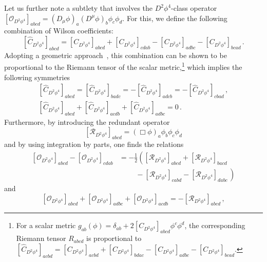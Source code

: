Let us further note a subtlety that involves the $D^2\phi^4$-class operator $[\mathcal O_{D^2\phi^4}]_{abcd} = (D_\mu \phi)_a (D^\mu \phi)_b \phi_c \phi_d$. 
For this, we define the following combination of Wilson coefficients:
\begin{equation}\label{eq:hatCD2phi4}
\left[\widehat C_{D^2\phi^4}\right]_{abcd}=\left[C_{D^2\phi^4}\right]_{abcd}+\left[C_{D^2\phi^4}\right]_{cdab}-\left[C_{D^2\phi^4}\right]_{adbc}-\left[C_{D^2\phi^4}\right]_{bcad}\,.
\end{equation}
Adopting a geometric approach~\cite{Helset:2022pde,Assi:2023zid,Jenkins:2023rtg,Jenkins:2023bls}, this combination can be shown to be proportional to the Riemann tensor of the scalar metric,\footnote{For a scalar metric $g_{ab}(\phi) = \delta_{ab} + 2[C_{D^2\phi^4}]_{abcd}\phi^c \phi^d$, the corresponding Riemann tensor $R_{abcd}$ is proportional to $[\widehat C_{D^2\phi^4}]_{acbd} = [C_{D^2\phi^4}]_{acbd}+[C_{D^2\phi^4}]_{bdac}-[C_{D^2\phi^4}]_{adbc}-[C_{D^2\phi^4}]_{bcad}$.} which implies the following symmetries
\begin{gather}
    \left[\widehat C_{D^2\phi^4}\right]_{abcd} = \left[\widehat C_{D^2\phi^4}\right]_{badc} = -\left[\widehat C_{D^2\phi^4}\right]_{adcb} = -\left[\widehat C_{D^2\phi^4}\right]_{cbad}\,,\\
    \left[\widehat C_{D^2\phi^4}\right]_{abcd} + \left[\widehat C_{D^2\phi^4}\right]_{acdb} + \left[\widehat C_{D^2\phi^4}\right]_{adbc} = 0\,.
\end{gather}
Furthermore, by introducing the redundant operator
\begin{equation}
\left[\mathcal R_{D^2\phi^4}\right]_{abcd} = (\Box \phi)_a \phi_b \phi_c \phi_d
\end{equation}
and by using integration by parts, one finds the relations
\begin{align}
    \left[\mathcal O_{D^2\phi^4}\right]_{abcd} - \left[\mathcal O_{D^2\phi^4}\right]_{cdab} &= -\frac{1}{2}\left(
    \left[\mathcal R_{D^2\phi^4}\right]_{abcd} + \left[\mathcal R_{D^2\phi^4}\right]_{bacd}\right.\nonumber\\
    &\left.\qquad\,\,-\left[\mathcal R_{D^2\phi^4}\right]_{cabd}-\left[\mathcal R_{D^2\phi^4}\right]_{dabc}\,
    \right)
\end{align}
and
\begin{equation}
    \left[\mathcal O_{D^2\phi^4}\right]_{abcd} + \left[\mathcal O_{D^2\phi^4}\right]_{adbc} +
    \left[\mathcal O_{D^2\phi^4}\right]_{acdb}  = -\left[\mathcal R_{D^2\phi^4}\right]_{abcd}\,,\label{eq:D2phi4symmetric}
\end{equation}
